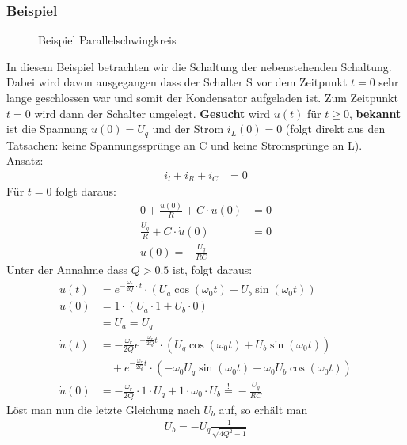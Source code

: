 \subsubsection{Beispiel}
\begin{wrapfigure}{l}{0.5\textwidth}
	\centering
	
	\caption{Beispiel Parallelschwingkreis}
	\label{fig:ParallelSkBsp}
\end{wrapfigure}
In diesem Beispiel betrachten wir die Schaltung der nebenstehenden Schaltung.
Dabei wird davon ausgegangen dass der Schalter S vor dem Zeitpunkt $t = 0$ sehr
lange geschlossen war und somit der Kondensator aufgeladen ist. Zum Zeitpunkt
$t=0$ wird dann der Schalter umgelegt. \textbf{Gesucht} wird $u(t)$ für $t \geq
0$, \textbf{bekannt} ist die Spannung $u(0) = U_q$ und der Strom $i_L(0) = 0$
(folgt direkt aus den Tatsachen: keine Spannungssprünge an C und keine
Stromsprünge an L). \\

Ansatz:
\begin{align*}
i_l + i_R + i_C &= 0
\end{align*}
Für $t=0$ folgt daraus:
\begin{align}
0 + \frac{u(0)}{R} + C \cdot \dot{u}(0) &= 0 \nonumber \\
\frac{U_q}{R} + C \cdot \dot{u}(0) &= 0 \nonumber \\
\boxed{\dot{u}(0) = -\frac{U_q}{RC}}
\end{align}
Unter der Annahme dass $Q > 0.5$ ist, folgt daraus:
\begin{align}
u(t) &= e^{-\frac{\omega_r}{2Q}\cdot t} \cdot \left(U_a \cos(\omega_0 t) + U_b
\sin(\omega_0 t) \right) \nonumber \\
u(0) &= 1 \cdot \left(U_a \cdot 1 + U_b \cdot 0 \right) \nonumber \\
&\boxed{= U_a = U_q} \\
\dot{u}(t) &= -\frac{\omega_r}{2Q} e^{-\frac{\omega_r}{2Q}t} \cdot \left(
U_q \cos(\omega_0 t) + U_b \sin(\omega_0 t)\right) \nonumber \\
&\quad + e^{-\frac{\omega_r}{2Q}t} \cdot \left( -\omega_0 U_q
\sin(\omega_0 t) + \omega_0 U_b \cos(\omega_0 t)\right) \nonumber \\
\dot{u}(0) &= -\frac{\omega_r}{2Q} \cdot 1 \cdot U_q + 1 \cdot \omega_0 \cdot
U_b \overset{!}{=} -\frac{U_q}{RC}\nonumber
\end{align}
Löst man nun die letzte Gleichung nach $U_b$ auf, so erhält man
\begin{align}
\boxed{U_b = -U_q \frac{1}{\sqrt{4Q^2-1}}}
\end{align}
